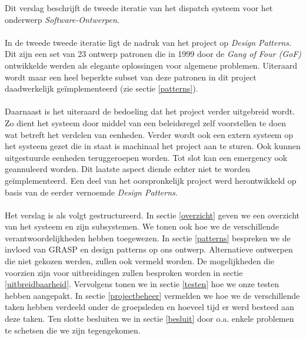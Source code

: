 Dit verslag beschrijft de tweede iteratie van het dispatch systeem voor het onderwerp \textit{Software-Ontwerpen}.
\paragraph{}
In de tweede tweede iteratie ligt de nadruk van het project op \textit{Design Patterns}. Dit zijn een set van 23 ontwerp patronen die in 1999 door de \textit{Gang of Four (GoF)} ontwikkelde werden als elegante oplossingen voor algemene problemen. Uiteraard wordt maar een heel beperkte subset van deze patronen in dit project daadwerkelijk ge\"implementeerd (zie sectie \ref{patterns}).
\paragraph{}
Daarnaast is het uiteraard de bedoeling dat het project verder uitgebreid wordt. Zo dient het systeem door middel van een beleidsregel zelf voorstellen te doen wat betreft het verdelen van eenheden. Verder wordt ook een extern systeem op het systeem gezet die in staat is machinaal het project aan te sturen. Ook kunnen uitgestuurde eenheden teruggeroepen worden. Tot slot kan een emergency ook geannuleerd worden. Dit laatste aspect diende echter niet te worden ge\"implementeerd.
Een deel van het oorspronkelijk project werd herontwikkeld op basis van de eerder vernoemde \textit{Design Patterns}.
\paragraph{}
Het verslag is als volgt gestructureerd. In sectie \ref{overzicht} geven we een overzicht van het systeem en zijn subsystemen.
We tonen ook hoe we de verschillende verantwoordelijkheden hebben toegewezen.
In sectie \ref{patterns} bespreken we de invloed van GRASP en design patterns op ons ontwerp.
Alternatieve ontwerpen die niet gekozen werden, zullen ook vermeld worden.
De mogelijkheden die voorzien zijn voor uitbreidingen zullen besproken worden in sectie \ref{uitbreidbaarheid}.
Vervolgens tonen we in sectie \ref{testen} hoe we onze testen hebben aangepakt.
In sectie \ref{projectbeheer} vermelden we hoe we de verschillende taken hebben verdeeld onder de groepsleden
en hoeveel tijd er werd besteed aan deze taken.
Ten slotte besluiten we in sectie \ref{besluit} door o.a. enkele problemen te schetsen die we zijn tegengekomen.
